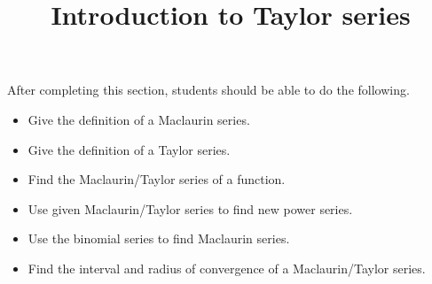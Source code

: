 \documentclass{ximera}
\title{Introduction to Taylor series}
\begin{document}
\begin{abstract}
\end{abstract}

\maketitle

\begin{sectionOutcomes}

After completing this section, students should be able to do the following.

\begin{itemize}
\item Give the definition of a Maclaurin series.
\item Give the definition of a Taylor series.
\item Find the Maclaurin/Taylor series of a function.
\item Use given Maclaurin/Taylor series to find new power series.
\item Use the binomial series to find Maclaurin series.
\item Find the interval and radius of convergence of a Maclaurin/Taylor series.
\end{itemize}

\end{sectionOutcomes}
\end{document}
